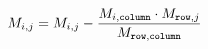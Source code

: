 \documentclass{article}
\begin{document}
\[ M_{i,j} = M_{i,j} - \frac{ M_{i, \text{\texttt{column}}} \cdot M_{\text{\texttt{row}}, j} }{ M_{\text{\texttt{row}}, \text{\texttt{column}}} } \]
\pagebreak
\end{document}
